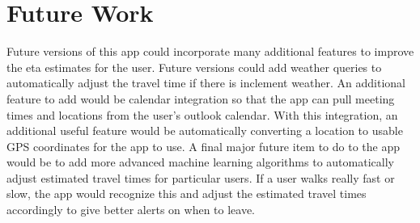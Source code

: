 \section{Future Work}
Future versions of this app could incorporate many additional features to improve the eta estimates for the user. Future versions could add weather queries to automatically adjust the travel time if there is inclement weather. An additional feature to add would be calendar integration so that the app can pull meeting times and locations from the user's outlook calendar. With this integration, an additional useful feature would be automatically converting a location to usable GPS coordinates for the app to use. A final major future item to do to the app would be to add more advanced machine learning algorithms to automatically adjust estimated travel times for particular users. If a user walks really fast or slow, the app would recognize this and adjust the estimated travel times accordingly to give better alerts on when to leave.
